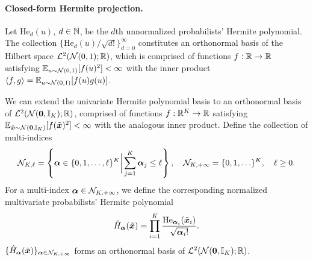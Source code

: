 \paragraph{Closed-form Hermite projection.}
Let $\mathrm{He}_d(u)$, $d\in\mathbb{N}$, be the $d$th unnormalized probabilists' Hermite polynomial.
The collection $\{\mathrm{He}_d(u)/\sqrt{d!}\}_{d=0}^{\infty}$ constitutes an orthonormal basis of the Hilbert space $\mathcal{L}^2(\mathcal{N}(0,1);\mathbb{R})$, which is comprised of functions $f:\mathbb{R}\to\mathbb{R}$ satisfying $\mathbb{E}_{u\sim\mathcal{N}(0,1)}[f(u)^2]<\infty$ with the inner product $\langle f,g\rangle=\mathbb{E}_{u\sim\mathcal{N}(0,1)}[f(u)g(u)]$.

We can extend the univariate Hermite polynomial basis to an orthonormal basis of $\mathcal{L}^2(\mathcal{N}(\boldsymbol{0},\mathbb{I}_K);\mathbb{R})$, comprised of functions $f:\mathbb{R}^K\to\mathbb{R}$ satisfying $\mathbb{E}_{\tilde{\boldsymbol{x}}\sim\mathcal{N}(\boldsymbol{0},\mathbb{I}_K)}[f(\tilde{\boldsymbol{x}})^2]<\infty$ with the analogous inner product.
Define the collection of multi-indices
\begin{equation*}
\mathcal{N}_{K, \ell} = \left\{ \boldsymbol{\alpha} \in \{0, 1, \ldots, \ell\}^K \bigg| \sum_{j=1}^K \boldsymbol{\alpha}_j \leq \ell\right\}, \quad \mathcal{N}_{K, +\infty} = \{0, 1, \ldots\}^K, \quad \ell \geq 0.
\end{equation*}
For a multi-index $\boldsymbol{\alpha} \in \mathcal{N}_{K, +\infty}$, we define the corresponding normalized multivariate probabilists' Hermite polynomial
\begin{equation}\label{app:eq:hermite-basis}
\hat{H}_{\boldsymbol{\alpha}}(\tilde{\boldsymbol{x}}) =\prod_{i=1}^K \frac{\mathrm{He}_{\boldsymbol{\alpha}_i}(\tilde{\boldsymbol{x}}_i)}{\sqrt{\boldsymbol{\alpha}_i!}}.
\end{equation}
$\{\hat{H}_{\boldsymbol{\alpha}}(\tilde{\boldsymbol{x}})\}_{\boldsymbol{\alpha}\in\mathcal{N}_{K,+\infty}}$ forms an orthonormal basis of $\mathcal{L}^2(\mathcal{N}(\boldsymbol{0},\mathbb{I}_K);\mathbb{R})$.

